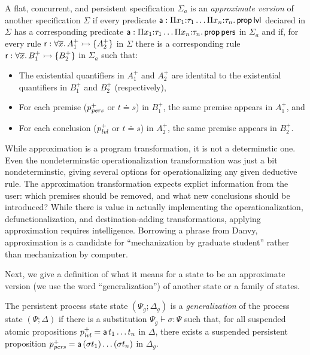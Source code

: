 \bigskip
\begin{definition}\label{def:approxversion}
  A flat, concurrent, and persistent specification $\Sigma_a$ is an
  {\em approximate version} of another specification $\Sigma$ if every
  predicate ${\sf a} : \Pi x_1{:}\tau_1 \ldots \Pi x_n{:}\tau_n.\,
  {\sf prop}\,{\sf lvl}$ deciared in $\Sigma$ has a corresponding
  predicate ${\sf a} : \Pi x_1{:}\tau_1 \ldots \Pi x_n{:}\tau_n.\,
  {\sf prop}\,{\sf pers}$ in $\Sigma_a$ and if, for every rule ${\sf
    r} : \forall \overline{x}.\,A_1^+ \rightarrowtail \{ A_2^+ \}$ in $\Sigma$ there
  is a corresponding rule ${\sf r} : \forall \overline{x}.\,B_1^+ \rightarrowtail
  \{ B_2^+ \}$ in $\Sigma_a$ such that:
  \begin{itemize}
  \item The existential quantifiers in $A_1^+$ and $A_2^+$ are
    identital to the existential quantifiers in $B_1^+$ and $B_2^+$
    (respectively),
  \item For each premise ($p^+_{\it pers}$ or $t \doteq s$) in $B^+_1$,
    the same premise appears in $A^+_1$, and 
  \item For each conclusion ($p^+_{\it lvl}$ or $t
    \doteq s$) in $A^+_2$, the same premise appears in $B^+_2$.
  \end{itemize}
\end{definition}
\bigskip

\noindent
While approximation is a program transformation, it is not a
determinstic one. Even the nondeterminstic operationalization
transformation was just a bit nondeterminstic, giving several options
for operationalizing any given deductive rule. The approximation
transformation expects explict information from the user: which
premises should be removed, and what new conclusions should be
introduced? While there is value in actually implementing the
operationalization, defunctionalization, and destination-adding
transformations, applying approximation requires
intelligence. Borrowing a phrase from Danvy, approximation is a
candidate for ``mechanization by graduate student'' rather than
mechanization by computer.

Next, we give a definition of what it means for a state to be an 
approximate version (we use the word ``generalization'') of another state
or a family of states. 

\bigskip
\begin{definition}
  The persistent process state state $(\Psi_g; \Delta_g)$ is a {\em
    generalization} of the process state $(\Psi; \Delta)$ if there is
  a substitution $\Psi_g \vdash \sigma : \Psi$ such that, for all
  suspended atomic propositions $p^+_{\it lvl} = {\sf a}\,t_1\ldots t_n$
  in $\Delta$, there exists a suspended persistent proposition
  $p^+_{\it pers} = {\sf a}\,(\sigma t_1)\ldots(\sigma t_n)$ in
  $\Delta_g$.
\end{definition}
\bigskip

